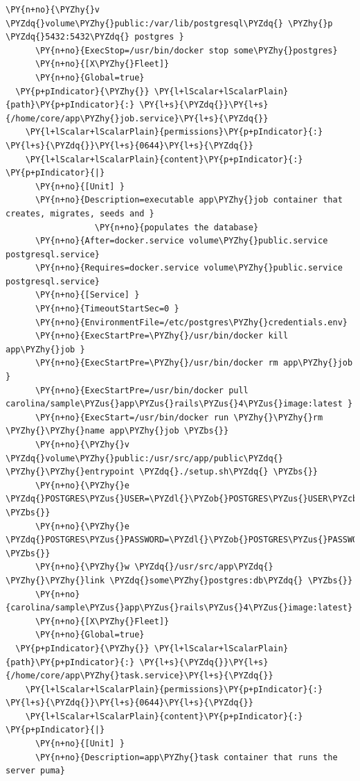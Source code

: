 \begin{codelisting}
\begin{Verbatim}[fontsize=\relsize{-2.5},fontseries=b,commandchars=\\\{\}]
      \PY{n+no}{\PYZhy{}v \PYZdq{}volume\PYZhy{}public:/var/lib/postgresql\PYZdq{} \PYZhy{}p \PYZdq{}5432:5432\PYZdq{} postgres }
      \PY{n+no}{ExecStop=/usr/bin/docker stop some\PYZhy{}postgres}
      \PY{n+no}{[X\PYZhy{}Fleet]}
      \PY{n+no}{Global=true}
  \PY{p+pIndicator}{\PYZhy{}} \PY{l+lScalar+lScalarPlain}{path}\PY{p+pIndicator}{:} \PY{l+s}{\PYZdq{}}\PY{l+s}{/home/core/app\PYZhy{}job.service}\PY{l+s}{\PYZdq{}}
    \PY{l+lScalar+lScalarPlain}{permissions}\PY{p+pIndicator}{:} \PY{l+s}{\PYZdq{}}\PY{l+s}{0644}\PY{l+s}{\PYZdq{}}
    \PY{l+lScalar+lScalarPlain}{content}\PY{p+pIndicator}{:} \PY{p+pIndicator}{|}
      \PY{n+no}{[Unit] }
      \PY{n+no}{Description=executable app\PYZhy{}job container that creates, migrates, seeds and }
                  \PY{n+no}{populates the database}
      \PY{n+no}{After=docker.service volume\PYZhy{}public.service postgresql.service}
      \PY{n+no}{Requires=docker.service volume\PYZhy{}public.service postgresql.service}
      \PY{n+no}{[Service] }
      \PY{n+no}{TimeoutStartSec=0 }
      \PY{n+no}{EnvironmentFile=/etc/postgres\PYZhy{}credentials.env}
      \PY{n+no}{ExecStartPre=\PYZhy{}/usr/bin/docker kill app\PYZhy{}job }
      \PY{n+no}{ExecStartPre=\PYZhy{}/usr/bin/docker rm app\PYZhy{}job }
      \PY{n+no}{ExecStartPre=/usr/bin/docker pull carolina/sample\PYZus{}app\PYZus{}rails\PYZus{}4\PYZus{}image:latest }
      \PY{n+no}{ExecStart=/usr/bin/docker run \PYZhy{}\PYZhy{}rm \PYZhy{}\PYZhy{}name app\PYZhy{}job \PYZbs{}}
      \PY{n+no}{\PYZhy{}v \PYZdq{}volume\PYZhy{}public:/usr/src/app/public\PYZdq{} \PYZhy{}\PYZhy{}entrypoint \PYZdq{}./setup.sh\PYZdq{} \PYZbs{}}
      \PY{n+no}{\PYZhy{}e \PYZdq{}POSTGRES\PYZus{}USER=\PYZdl{}\PYZob{}POSTGRES\PYZus{}USER\PYZcb{}\PYZdq{} \PYZbs{}}
      \PY{n+no}{\PYZhy{}e \PYZdq{}POSTGRES\PYZus{}PASSWORD=\PYZdl{}\PYZob{}POSTGRES\PYZus{}PASSWORD\PYZcb{}\PYZdq{} \PYZbs{}}
      \PY{n+no}{\PYZhy{}w \PYZdq{}/usr/src/app\PYZdq{} \PYZhy{}\PYZhy{}link \PYZdq{}some\PYZhy{}postgres:db\PYZdq{} \PYZbs{}}
      \PY{n+no}{carolina/sample\PYZus{}app\PYZus{}rails\PYZus{}4\PYZus{}image:latest}
      \PY{n+no}{[X\PYZhy{}Fleet]}
      \PY{n+no}{Global=true}
  \PY{p+pIndicator}{\PYZhy{}} \PY{l+lScalar+lScalarPlain}{path}\PY{p+pIndicator}{:} \PY{l+s}{\PYZdq{}}\PY{l+s}{/home/core/app\PYZhy{}task.service}\PY{l+s}{\PYZdq{}}
    \PY{l+lScalar+lScalarPlain}{permissions}\PY{p+pIndicator}{:} \PY{l+s}{\PYZdq{}}\PY{l+s}{0644}\PY{l+s}{\PYZdq{}}
    \PY{l+lScalar+lScalarPlain}{content}\PY{p+pIndicator}{:} \PY{p+pIndicator}{|}
      \PY{n+no}{[Unit] }
      \PY{n+no}{Description=app\PYZhy{}task container that runs the server puma}

\end{Verbatim}
\end{codelisting}
